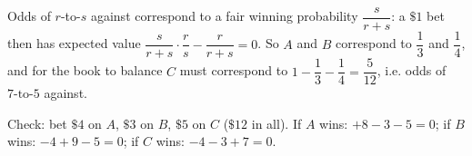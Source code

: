 Odds of $r$-to-$s$ against correspond to a fair winning probability $\dfrac s{r+s}$: a $\$1$ bet then has expected value $\dfrac s{r+s}\cdot\dfrac rs-\dfrac r{r+s}=0$. So $A$ and $B$ correspond to $\dfrac13$ and $\dfrac14$, and for the book to balance $C$ must correspond to $1-\dfrac13-\dfrac14=\dfrac5{12}$, i.e. odds of $\boxed{7\text{-to-}5}$ against.

Check: bet $\$4$ on $A$, $\$3$ on $B$, $\$5$ on $C$ ($\$12$ in all). If $A$ wins: $+8-3-5=0$; if $B$ wins: $-4+9-5=0$; if $C$ wins: $-4-3+7=0$.
